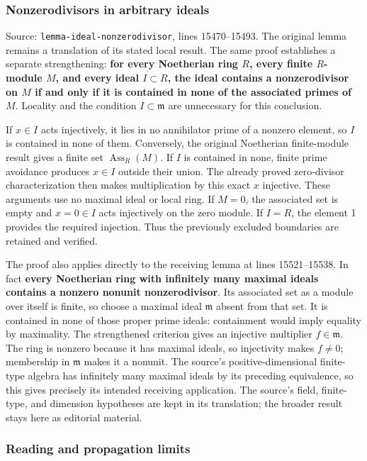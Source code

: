 \subsubsection{Nonzerodivisors in arbitrary ideals}\label{nonzerodivisors-in-arbitrary-ideals}

Source: \texttt{lemma-ideal-nonzerodivisor}, lines 15470--15493. The original lemma remains a translation of its stated local result. The same proof establishes a separate strengthening: \textbf{for every Noetherian ring \(R\), every finite \(R\)-module \(M\), and every ideal \(I\subset R\), the ideal contains a nonzerodivisor on \(M\) if and only if it is contained in none of the associated primes of \(M\)}. Locality and the condition \(I\subset\mathfrak m\) are unnecessary for this conclusion.

If \(x\in I\) acts injectively, it lies in no annihilator prime of a nonzero element, so \(I\) is contained in none of them. Conversely, the original Noetherian finite-module result gives a finite set \(\operatorname{Ass}_R(M)\). If \(I\) is contained in none, finite prime avoidance produces \(x\in I\) outside their union. The already proved zero-divisor characterization then makes multiplication by this exact \(x\) injective. These arguments use no maximal ideal or local ring. If \(M=0\), the associated set is empty and \(x=0\in I\) acts injectively on the zero module. If \(I=R\), the element 1 provides the required injection. Thus the previously excluded boundaries are retained and verified.

The proof also applies directly to the receiving lemma at lines 15521--15538. In fact \textbf{every Noetherian ring with infinitely many maximal ideals contains a nonzero nonunit nonzerodivisor}. Its associated set as a module over itself is finite, so choose a maximal ideal \(\mathfrak m\) absent from that set. It is contained in none of those proper prime ideals: containment would imply equality by maximality. The strengthened criterion gives an injective multiplier \(f\in\mathfrak m\). The ring is nonzero because it has maximal ideals, so injectivity makes \(f\ne0\); membership in \(\mathfrak m\) makes it a nonunit. The source's positive-dimensional finite-type algebra has infinitely many maximal ideals by its preceding equivalence, so this gives precisely its intended receiving application. The source's field, finite-type, and dimension hypotheses are kept in its translation; the broader result stays here as editorial material.

\subsubsection{Reading and propagation limits}\label{reading-and-propagation-limits}

